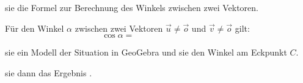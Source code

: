 \documentclass[10pt, a4paper]{scrartcl}
\begin{document}
\begin{aufgabe}
	 sie die Formel zur Berechnung des Winkels zwischen zwei Vektoren.
	\medskip
	\begin{rahmen}
		Für den Winkel $\alpha$ zwischen zwei Vektoren $\vec{u}\neq\vec{o}$ und 
			$\vec{v}\neq\vec{o}$ gilt:
			\[ \cos{\alpha} = \hspace{4cm} \]
	\end{rahmen}
\end{aufgabe}

\vspace{1cm}
\begin{aufgabe}[subtitle={Buch S.196, Afg.3}]
	 sie ein Modell der Situation in GeoGebra und  sie den Winkel am Eckpunkt $C$. 
	
	
	 sie dann das Ergebnis . 
\end{aufgabe}
\end{document}
